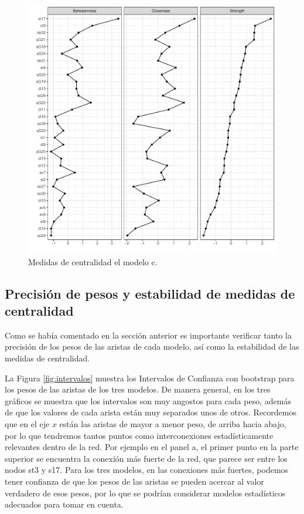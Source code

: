 \documentclass[11pt,spanish]{article}\usepackage[]{graphicx}\usepackage[]{color}
\begin{document}
\begin{figure}[ht!]
\centering
\includegraphics[scale=0.8]{images/centrality_net_todo.pdf}
\caption{Medidas de centralidad el modelo c.}
\label{fig:centra_todos}
\end{figure}

\clearpage

\newpage

\subsection{Precisión de pesos y estabilidad de medidas de centralidad}

Como se había comentado en la sección anterior es importante verificar tanto la precisión de los pesos de las aristas de cada modelo, así como la estabilidad de las medidas de centralidad. 

La Figura \ref{fig:intervalos} muestra los Intervalos de Confianza con bootstrap para los pesos de las aristas de los tres modelos. De manera general, en los tres gráficos se muestra que los intervalos son muy angostos para cada peso, además de que los valores de cada arista están muy separados unos de otros. Recordemos que en el eje $x$ están las aristas de mayor a menor peso, de arriba hacia abajo, por lo que tendremos tantos puntos como interconexiones estadísticamente relevantes dentro de la red. Por ejemplo en el panel a, el primer punto en la parte superior se encuentra la conexión más fuerte de la red, que parece ser entre los nodos st3 y s17. Para los tres modelos, en las conexiones más fuertes, podemos tener confianza de que los pesos de las aristas se pueden acercar al valor verdadero de esos pesos, por lo que se podrían considerar modelos estadísticos adecuados para tomar en cuenta.
\end{document}
